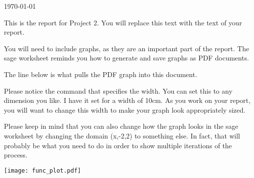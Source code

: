 \documentclass[11pt]{article}
\begin{document}
\today

\begin{report}
This is the report for Project 2. You will replace this text with the text of your report.

You will need to include graphs, as they are an important part of the report. The sage worksheet reminds you how to generate and save graphs as PDF documents.

The line below is what pulls the PDF graph into this document.

Please notice the command that specifies the width. You can set this to any dimension you like. I have it set for a width of 10cm. As you work on your report, you will want to change this width to make your graph look appropriately sized.

Please keep in mind that you can also change how the graph looks in the sage worksheet by changing the domain (x,-2,2) to something else. In fact, that will probably be what you need to do in order to show multiple iterations of the process.

\texttt{[image: func\_plot.pdf]}

\end{report}
\end{document}
